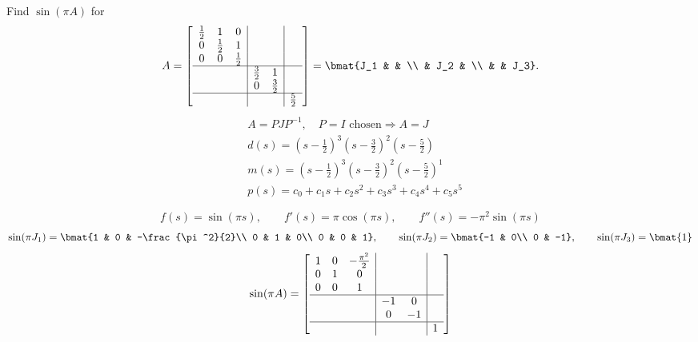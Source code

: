 \begin{example}
Find $\sin(\pi A)$ for
\[
A = \left[\begin{array}{ccc|cc|c}
\frac12 & 1 & 0 & & & \\
0 & \frac12 & 1 & & & \\
0 & 0 & \frac12 & & & \\ \hline
 & & & \frac32 & 1 & \\
 & & & 0 & \frac32 & \\ \hline
 & & & & & \frac52
\end{array}\right]
= \bmat{J_1 & & \\ & J_2 & \\ & & J_3}.
\]
\begin{align*}
&A = PJP^{-1}, \quad P = I \text{ chosen} \Rightarrow A = J\\
&d(s) = \left(s-\tfrac12\right)^3\left(s-\tfrac32\right)^2\left(s-\tfrac52\right)\\
&m(s) = \left(s-\tfrac12\right)^3\left(s-\tfrac32\right)^2\left(s-\tfrac52\right)^1\\
&p(s) = c_0 + c_1s + c_2s^2 + c_3s^3 + c_4s^4 + c_5s^5
\end{align*}

\[
f(s) = \sin(\pi s), \qquad f'(s) = \pi\cos(\pi s), \qquad f''(s) = -\pi^2\sin(\pi s)
\]
\[
\sin(\pi J_1) = \bmat{1 & 0 & -\frac{\pi^2}{2}\\ 0 & 1 & 0\\ 0 & 0 & 1},
\qquad
\sin(\pi J_2) = \bmat{-1 & 0\\ 0 & -1},
\qquad
\sin(\pi J_3) = \bmat{1}
\]
\[
\sin(\pi A) = \left[\begin{array}{ccc|cc|c}
1 & 0 & -\frac{\pi^2}{2} & & & \\
0 & 1 & 0 & & & \\
0 & 0 & 1 & & & \\ \hline
 & & & -1 & 0 & \\
 & & & 0 & -1 & \\ \hline
 & & & & & 1
\end{array}\right]
\]
\end{example}

